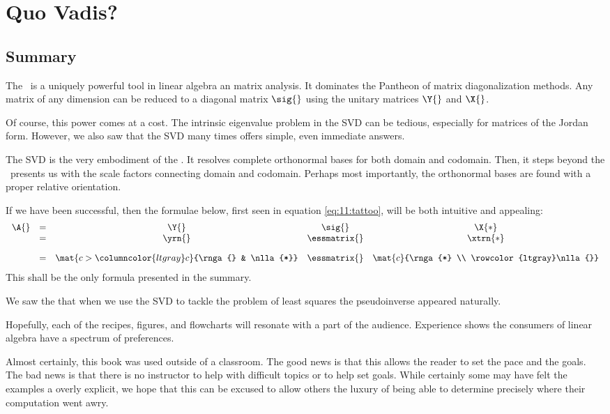 \chapter[Quo Vadis?]{Quo Vadis?}

\section{Summary}
The \svdp\ is a uniquely powerful tool in linear algebra an matrix analysis. It dominates the Pantheon of matrix diagonalization methods. Any matrix of any dimension can be reduced to a diagonal matrix $\sig{}$ using the unitary matrices $\Y{}$ and $\X{}$. 

Of course, this power comes at a cost. The intrinsic eigenvalue problem in the SVD can be tedious, especially for matrices of the Jordan form. However, we also saw that the SVD many times offers simple, even immediate answers.

The SVD is the very embodiment of the \ftola. It resolves complete orthonormal bases for both domain and  codomain. Then, it steps beyond the \ft\ presents us with the scale factors connecting domain and codomain. Perhaps most importantly, the orthonormal bases are found with a proper relative orientation.

If we have been successful, then the formulae below, first seen in equation \eqref{eq:11:tattoo}, will be both intuitive and appealing:
\begin{equation*}
  \begin{array}{ccccc}
  \A{} & = & \Y{} & \sig{} & \X{*} \\
    & = & \yrn{}
        & \essmatrix{} 
        & \xtrn{*}  \\[10pt]
    & = & \mat{c>{\columncolor{ltgray}}c}{\rnga{} & \nlla{*}} 
        & \essmatrix{} 
        & \mat{c}{\rnga{*} \\ \rowcolor{ltgray}\nlla{}}
  \end{array}  
\end{equation*}
This shall be the only formula presented in the summary.

We saw the that when we use the SVD to tackle the problem of least squares the pseudoinverse appeared naturally.

Hopefully, each of the recipes, figures, and flowcharts will resonate with a part of the audience. Experience shows the consumers of linear algebra have a spectrum of preferences.

Almost certainly, this book was used outside of a classroom. The good news is that this allows the reader to set the pace and the goals. The bad news is that there is no instructor to help with difficult topics or to help set goals. While certainly some may have felt the examples a overly explicit, we hope that this can be excused to allow others the luxury of being able to determine precisely where their computation went awry.

